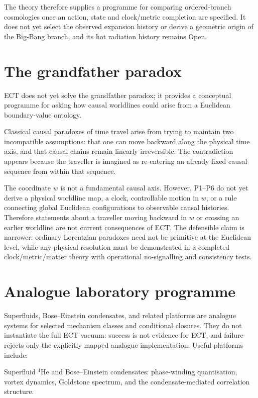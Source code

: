 \documentclass[11pt,a4paper]{article}
\begin{document}
The theory therefore supplies a programme for comparing ordered-branch
cosmologies once an action, state and clock/metric completion are specified.
It does not yet select the observed expansion history or derive a geometric
origin of the Big-Bang branch, and its hot radiation history remains Open.

\section{The grandfather paradox}

ECT does not yet solve the grandfather paradox; it provides a conceptual
programme for asking how causal worldlines could arise from a Euclidean
boundary-value ontology.

Classical causal paradoxes of time travel arise from trying to maintain two incompatible assumptions: that one can move backward along the physical time axis, and that causal chains remain linearly irreversible. The contradiction appears because the traveller is imagined as re-entering an already fixed causal sequence from within that sequence.

The coordinate $w$ is not a fundamental causal axis.  However, P1--P6 do
not yet derive a physical worldline map, a clock, controllable motion in
$w$, or a rule connecting global Euclidean configurations to observable
causal histories.  Therefore statements about a traveller moving backward
in $w$ or crossing an earlier worldline are not current consequences of
ECT.  The defensible claim is narrower: ordinary Lorentzian paradoxes need
not be primitive at the Euclidean level, while any physical resolution must
be demonstrated in a completed clock/metric/matter theory with operational
no-signalling and consistency tests.


\section{Analogue laboratory programme}

Superfluids, Bose--Einstein condensates, and related platforms are analogue systems for selected mechanism classes and conditional closures. They do not instantiate the full ECT vacuum: success is not evidence for ECT, and failure rejects only the explicitly mapped analogue implementation. Useful platforms include:

Superfluid $^4$He and Bose--Einstein condensates: phase-winding quantisation, vortex dynamics, Goldstone spectrum, and the condensate-mediated correlation structure.
\end{document}

